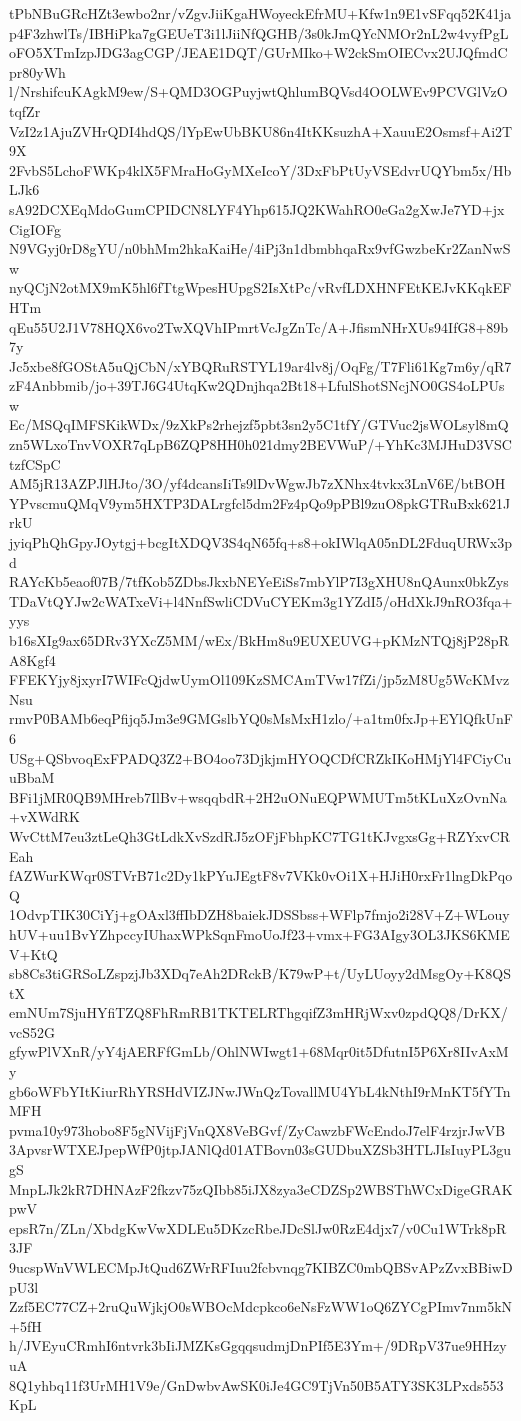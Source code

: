 tPbNBuGRcHZt3ewbo2nr/vZgvJiiKgaHWoyeckEfrMU+Kfw1n9E1vSFqq52K41ja
p4F3zhwlTs/IBHiPka7gGEUeT3i1lJiiNfQGHB/3s0kJmQYcNMOr2nL2w4vyfPgL
oFO5XTmIzpJDG3agCGP/JEAE1DQT/GUrMIko+W2ckSmOIECvx2UJQfmdCpr80yWh
l/NrshifcuKAgkM9ew/S+QMD3OGPuyjwtQhlumBQVsd4OOLWEv9PCVGlVzOtqfZr
VzI2z1AjuZVHrQDI4hdQS/lYpEwUbBKU86n4ItKKsuzhA+XauuE2Osmsf+Ai2T9X
2FvbS5LchoFWKp4klX5FMraHoGyMXeIcoY/3DxFbPtUyVSEdvrUQYbm5x/HbLJk6
sA92DCXEqMdoGumCPIDCN8LYF4Yhp615JQ2KWahRO0eGa2gXwJe7YD+jxCigIOFg
N9VGyj0rD8gYU/n0bhMm2hkaKaiHe/4iPj3n1dbmbhqaRx9vfGwzbeKr2ZanNwSw
nyQCjN2otMX9mK5hl6fTtgWpesHUpgS2IsXtPc/vRvfLDXHNFEtKEJvKKqkEFHTm
qEu55U2J1V78HQX6vo2TwXQVhIPmrtVcJgZnTc/A+JfismNHrXUs94IfG8+89b7y
Jc5xbe8fGOStA5uQjCbN/xYBQRuRSTYL19ar4lv8j/OqFg/T7Fli61Kg7m6y/qR7
zF4Anbbmib/jo+39TJ6G4UtqKw2QDnjhqa2Bt18+LfulShotSNcjNO0GS4oLPUsw
Ec/MSQqIMFSKikWDx/9zXkPs2rhejzf5pbt3sn2y5C1tfY/GTVuc2jsWOLsyl8mQ
zn5WLxoTnvVOXR7qLpB6ZQP8HH0h021dmy2BEVWuP/+YhKc3MJHuD3VSCtzfCSpC
AM5jR13AZPJlHJto/3O/yf4dcansIiTs9lDvWgwJb7zXNhx4tvkx3LnV6E/btBOH
YPvscmuQMqV9ym5HXTP3DALrgfcl5dm2Fz4pQo9pPBl9zuO8pkGTRuBxk621JrkU
jyiqPhQhGpyJOytgj+bcgItXDQV3S4qN65fq+s8+okIWlqA05nDL2FduqURWx3pd
RAYcKb5eaof07B/7tfKob5ZDbsJkxbNEYeEiSs7mbYlP7I3gXHU8nQAunx0bkZys
TDaVtQYJw2cWATxeVi+l4NnfSwliCDVuCYEKm3g1YZdI5/oHdXkJ9nRO3fqa+yys
b16sXIg9ax65DRv3YXcZ5MM/wEx/BkHm8u9EUXEUVG+pKMzNTQj8jP28pRA8Kgf4
FFEKYjy8jxyrI7WIFcQjdwUymOl109KzSMCAmTVw17fZi/jp5zM8Ug5WcKMvzNsu
rmvP0BAMb6eqPfijq5Jm3e9GMGslbYQ0sMsMxH1zlo/+a1tm0fxJp+EYlQfkUnF6
USg+QSbvoqExFPADQ3Z2+BO4oo73DjkjmHYOQCDfCRZkIKoHMjYl4FCiyCuuBbaM
BFi1jMR0QB9MHreb7IlBv+wsqqbdR+2H2uONuEQPWMUTm5tKLuXzOvnNa+vXWdRK
WvCttM7eu3ztLeQh3GtLdkXvSzdRJ5zOFjFbhpKC7TG1tKJvgxsGg+RZYxvCREah
fAZWurKWqr0STVrB71c2Dy1kPYuJEgtF8v7VKk0vOi1X+HJiH0rxFr1lngDkPqoQ
1OdvpTIK30CiYj+gOAxl3ffIbDZH8baiekJDSSbss+WFlp7fmjo2i28V+Z+WLouy
hUV+uu1BvYZhpccyIUhaxWPkSqnFmoUoJf23+vmx+FG3AIgy3OL3JKS6KMEV+KtQ
sb8Cs3tiGRSoLZspzjJb3XDq7eAh2DRckB/K79wP+t/UyLUoyy2dMsgOy+K8QStX
emNUm7SjuHYfiTZQ8FhRmRB1TKTELRThgqifZ3mHRjWxv0zpdQQ8/DrKX/vcS52G
gfywPlVXnR/yY4jAERFfGmLb/OhlNWIwgt1+68Mqr0it5DfutnI5P6Xr8IIvAxMy
gb6oWFbYItKiurRhYRSHdVIZJNwJWnQzTovallMU4YbL4kNthI9rMnKT5fYTnMFH
pvma10y973hobo8F5gNVijFjVnQX8VeBGvf/ZyCawzbFWcEndoJ7elF4rzjrJwVB
3ApvsrWTXEJpepWfP0jtpJANlQd01ATBovn03sGUDbuXZSb3HTLJIsIuyPL3gugS
MnpLJk2kR7DHNAzF2fkzv75zQIbb85iJX8zya3eCDZSp2WBSThWCxDigeGRAKpwV
epsR7n/ZLn/XbdgKwVwXDLEu5DKzcRbeJDcSlJw0RzE4djx7/v0Cu1WTrk8pR3JF
9ucspWnVWLECMpJtQud6ZWrRFIuu2fcbvnqg7KIBZC0mbQBSvAPzZvxBBiwDpU3l
Zzf5EC77CZ+2ruQuWjkjO0sWBOcMdcpkco6eNsFzWW1oQ6ZYCgPImv7nm5kN+5fH
h/JVEyuCRmhI6ntvrk3bIiJMZKsGgqqsudmjDnPIf5E3Ym+/9DRpV37ue9HHzyuA
8Q1yhbq11f3UrMH1V9e/GnDwbvAwSK0iJe4GC9TjVn50B5ATY3SK3LPxds553KpL
